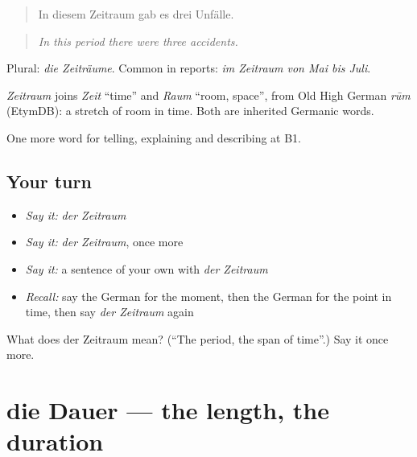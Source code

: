 \begin{quote}
In diesem Zeitraum gab es drei Unfälle.
\end{quote}

\begin{quote}
\emph{In this period there were three accidents.}
\end{quote}

Plural: \emph{die Zeiträume}. Common in reports: \emph{im Zeitraum von Mai bis Juli}.

\begin{cousinweb}
\emph{Zeitraum} joins \emph{Zeit} \textquotedblleft{}time\textquotedblright{} and \emph{Raum} \textquotedblleft{}room, space\textquotedblright{}, from Old High German \emph{rūm} (EtymDB): a stretch of room in time. Both are inherited Germanic words.
\end{cousinweb}

\begin{grammarlens}[title={What you've built}]
One more word for telling, explaining and describing at B1.
\end{grammarlens}

\subsection*{Your turn}
\begin{itemize}
\raggedright
  \item \emph{Say it:} \emph{der Zeitraum}
  \item \emph{Say it:} \emph{der Zeitraum}, once more
  \item \emph{Say it:} a sentence of your own with \emph{der Zeitraum}
  \item \emph{Recall:} say the German for the moment, then the German for the point in time, then say \emph{der Zeitraum} again
\end{itemize}

\begin{tcolorbox}[breakable,colback=teal!4,colframe=teal!35!black,title={Before you move on}]
What does der Zeitraum mean? (\textquotedblleft{}The period, the span of time\textquotedblright{}.) Say it once more.
\end{tcolorbox}
\section[die Dauer]{die Dauer — the length, the duration}

\label{lesson:GE-C268-dauer}



